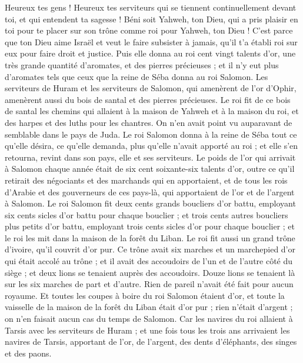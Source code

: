 \begin{multicols}{2}
Heureux tes gens ! Heureux tes serviteurs qui se tiennent continuellement devant toi, et qui entendent ta sagesse !
Béni soit Yahweh, ton Dieu, qui a pris plaisir en toi pour te placer sur son trône comme roi pour Yahweh, ton Dieu ! C'est parce que ton Dieu aime Israël et veut le faire subsister à jamais, qu'il t'a établi roi sur eux pour faire droit et justice.
Puis elle donna au roi cent vingt talents d'or, une très grande quantité d'aromates, et des pierres précieuses ; et il n'y eut plus d'aromates tels que ceux que la reine de Séba donna au roi Salomon.
Les serviteurs de Huram et les serviteurs de Salomon, qui amenèrent de l'or d'Ophir, amenèrent aussi du bois de santal et des pierres précieuses.
Le roi fit de ce bois de santal les chemins qui allaient à la maison de Yahweh et à la maison du roi, et des harpes et des luths pour les chantres. On n'en avait point vu auparavant de semblable dans le pays de Juda.
Le roi Salomon donna à la reine de Séba tout ce qu'elle désira, ce qu'elle demanda, plus qu'elle n'avait apporté au roi ; et elle s'en retourna, revint dans son pays, elle et ses serviteurs.
Le poids de l'or qui arrivait à Salomon chaque année était de six cent soixante-six talents d'or,
outre ce qu'il retirait des négociants et des marchands qui en apportaient, et de tous les rois d'Arabie et des gouverneurs de ces pays-là, qui apportaient de l'or et de l'argent à Salomon.
Le roi Salomon fit deux cents grands boucliers d'or battu, employant six cents sicles d'or battu pour chaque bouclier ;
et trois cents autres boucliers plus petits d'or battu, employant trois cents sicles d'or pour chaque bouclier ; et le roi les mit dans la maison de la forêt du Liban.
Le roi fit aussi un grand trône d'ivoire, qu'il couvrit d'or pur.
Ce trône avait six marches et un marchepied d'or qui était accolé au trône ; et il avait des accoudoirs de l'un et de l'autre côté du siège ; et deux lions se tenaient auprès des accoudoirs.
Douze lions se tenaient là sur les six marches de part et d'autre. Rien de pareil n'avait été fait pour aucun royaume.
Et toutes les coupes à boire du roi Salomon étaient d'or, et toute la vaisselle de la maison de la forêt du Liban était d'or pur ; rien n'était d'argent ; on n'en faisait aucun cas du temps de Salomon.
Car les navires du roi allaient à Tarsis avec les serviteurs de Huram ; et une fois tous les trois ans arrivaient les navires de Tarsis, apportant de l'or, de l'argent, des dents d'éléphants, des singes et des paons.

\end{multicols}
